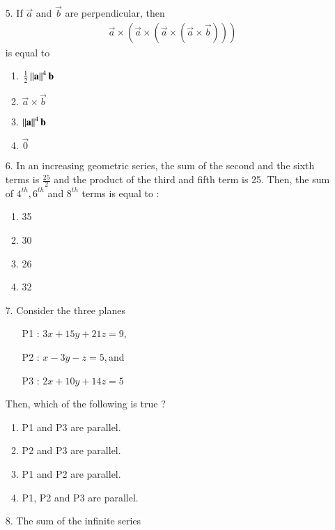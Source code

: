 \documentclass[journal,12pt,onecolumn]{IEEEtran}
\theoremstyle{remark}
\begin{document}
\begin{enumerate}
	\item[5.] If $\vec{a}$ and $\vec{b}$ are perpendicular, then 
	\begin{align*}
		\vec{a} \times \left(\vec{a} \times \left(\vec{a} \times \left(\vec{a} \times \vec{b}\right)\right)\right)
	\end{align*}
	is equal to 
		\hfill{}
		\begin{enumerate}
			\item $\frac{1}{2}\left\lVert\mathbf{a}\right\rVert^4 \mathbf{b}$ 
			\item $\vec{a} \times \vec{b}$ 
			\item $\left\lVert\mathbf{a}\right\rVert^4 \mathbf{b}$  
			\item $\vec{0}$
		\end{enumerate}
	\item[6.]
		In an increasing geometric series, the sum of the second and the sixth terms is $\frac{25}{2}$
		and the product of the third and fifth term is 25. Then, the sum of $4^{th}, 6^{th}$ and $8^{th}$ terms
		is equal to :
		\hfill{}
		\begin{multicols}{4}
		\begin{enumerate}
			\item 35 \columnbreak
			\item 30 \columnbreak
			\item 26 \columnbreak
			\item 32
		\end{enumerate}
	\end{multicols}
	\item[7.] Consider the three planes
		\begin{enumerate}
			\item[P1 :] $3x + 15y + 21z = 9,$
			\item[P2 :] $x - 3y - z = 5, $and 
			\item[P3 :] $2x + 10y + 14z = 5$
		\end{enumerate}
		Then, which of the following is true ?	
		\hfill{}
		\begin{enumerate}
			\item P1 and P3 are parallel. 
			\item P2 and P3 are parallel. 
			\item P1 and P2 are parallel. 
			\item P1, P2 and P3 are parallel.
		\end{enumerate}
\item[8.]
	The sum of the infinite series
	\begin{align}

\end{align}
\end{enumerate}
\end{document}
